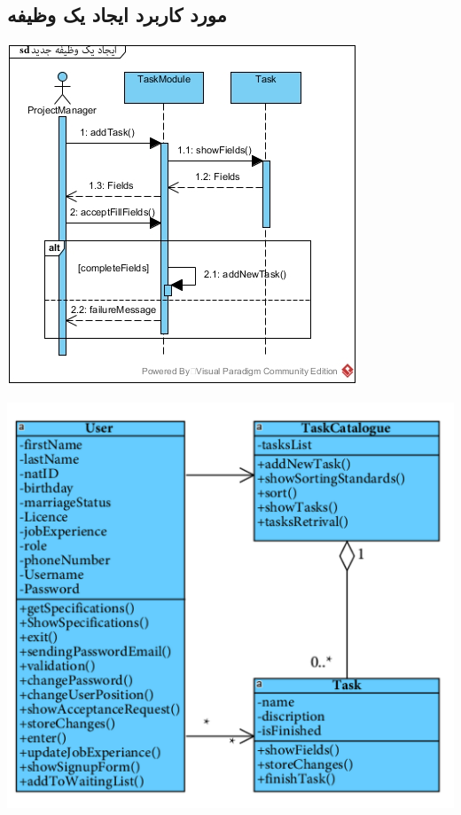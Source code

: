 \subsection*{مورد کاربرد ایجاد یک وظیفه}
\vspace{2cm}
\begin{center}
\includegraphics[width=\textwidth]{SequenceDiagrams/18.jpg}
\end{center}

\newpage
\vspace{2cm}
\begin{center}
\includegraphics[width=\textwidth]{SequenceClasses/18.png}
\end{center}

